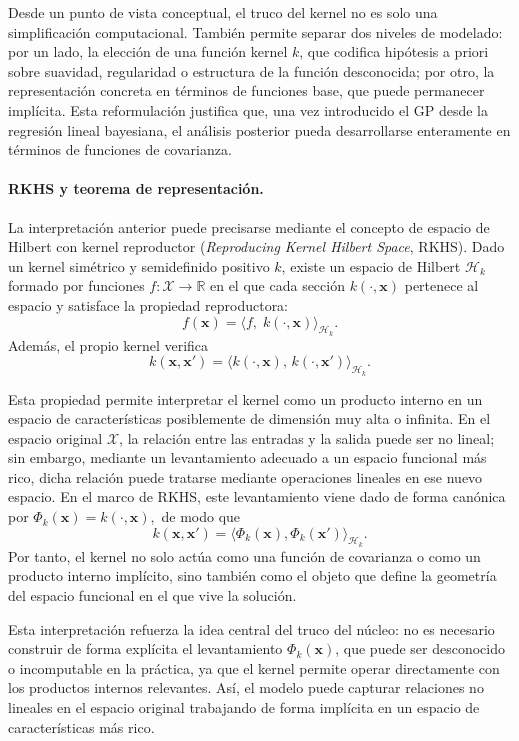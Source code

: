 Desde un punto de vista conceptual, el truco del kernel no es solo una simplificación
computacional. También permite separar dos niveles de modelado: por un lado, la elección
de una función kernel \(k\), que codifica hipótesis a priori sobre suavidad, regularidad o
estructura de la función desconocida; por otro, la representación concreta en términos de
funciones base, que puede permanecer implícita. Esta reformulación justifica que, una vez introducido el GP desde la regresión lineal
bayesiana, el análisis posterior pueda desarrollarse enteramente en términos de funciones de
covarianza.

\paragraph{RKHS y teorema de representación.}
La interpretación anterior puede precisarse mediante el concepto de espacio de Hilbert con
kernel reproductor (\emph{Reproducing Kernel Hilbert Space}, RKHS). Dado un kernel
simétrico y semidefinido positivo \(k\), existe un espacio de Hilbert \(\mathcal{H}_k\) formado
por funciones \(f:\mathcal{X}\to\mathbb{R}\) en el que cada sección \(k(\cdot,\bm{x})\) pertenece al
espacio y satisface la propiedad reproductora:
\[
f(\bm{x})=\langle f,\;k(\cdot,\bm{x})\rangle_{\mathcal{H}_k}.
\]
Además, el propio kernel verifica
\[
k(\bm{x},\bm{x}')=
\langle k(\cdot,\bm{x}),\,k(\cdot,\bm{x}')\rangle_{\mathcal{H}_k}.
\]

Esta propiedad permite interpretar el kernel como un producto interno en un espacio de
características posiblemente de dimensión muy alta o infinita. En el espacio original
\(\mathcal{X}\), la relación entre las entradas y la salida puede ser no lineal; sin embargo,
mediante un levantamiento adecuado a un espacio funcional más rico, dicha relación puede
tratarse mediante operaciones lineales en ese nuevo espacio. En el marco de RKHS, este
levantamiento viene dado de forma canónica por
\(
\Phi_k(\bm{x})=k(\cdot,\bm{x}),
\)
de modo que
\[
k(\bm{x},\bm{x}')=
\langle \Phi_k(\bm{x}),\Phi_k(\bm{x}')\rangle_{\mathcal{H}_k}.
\]
Por tanto, el kernel no solo actúa como una función de covarianza o como un producto
interno implícito, sino también como el objeto que define la geometría del espacio funcional
en el que vive la solución.

Esta interpretación refuerza la idea central del truco del núcleo: no es necesario construir
de forma explícita el levantamiento \(\Phi_k(\bm{x})\), que puede ser desconocido o
incomputable en la práctica, ya que el kernel permite operar directamente con los productos
internos relevantes. Así, el modelo puede capturar relaciones no lineales en el espacio
original trabajando de forma implícita en un espacio de características más rico.

